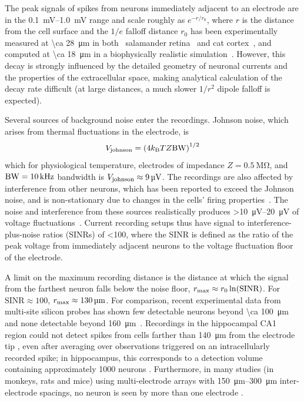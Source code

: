 The peak signals of spikes from neurons immediately adjacent to an electrode are in the \SIrange{0.1}{1.0}{\milli\volt} range and scale roughly as $e^{-r/r_0}$, where $r$ is the distance from the cell surface and the $1/e$ falloff distance $r_0$ has been experimentally measured at \SI{\ca 28}{\micro\meter} in both~\cite{Shoham2006} salamander retina~\cite{segev04} and cat cortex~\cite{gray95}, and computed at \SI{\ca 18}{\micro\meter} in a biophysically realistic simulation~\cite{gold07}.
However, this decay is strongly influenced by the detailed geometry of neuronal currents and the properties of the extracellular space, making analytical calculation of the decay rate difficult (at large distances, a much slower $1/r^2$ dipole falloff is expected).

Several sources of background noise enter the recordings.
Johnson noise, which arises from thermal fluctuations in the electrode, is \[V_{\text{\scriptsize johnson}} = \left(4k_{\text{\scriptsize B}} T Z \text{BW}\right)^{1/2}\]
which for physiological temperature, electrodes of impedance $Z = \SI{0.5}{\mega\ohm}$, and $\text{BW} = \SI{10}{\kilo\hertz}$ bandwidth is $V_{\text{\scriptsize johnson}} \approx \SI{9}{\micro\volt}$.
The recordings are also affected by interference from other neurons, which has been reported to exceed the Johnson noise, and is non-stationary due to changes in the cells' firing properties~\cite{sahani99}. 
The noise and interference from these sources realistically produces \SIrange{>10}{20}{\micro\volt} of voltage fluctuations~\cite{camunas13}.
Current recording setups thus have signal to interference-plus-noise ratios (SINRs) of \num{<100}, where the SINR is defined as the ratio of the peak voltage from immediately adjacent neurons to the voltage fluctuation floor of the electrode.

A limit on the maximum recording distance is the distance at which the signal from the farthest neuron falls below the noise floor, $r_{\text{\scriptsize max}} \approx r_{\text{\scriptsize 0}}\ln(\text{SINR})$. For $\text{SINR} \approx 100$, $r_{\text{\scriptsize max}} \approx \SI{130}{\micro\meter}$. For comparison, recent experimental data from multi-site silicon probes has shown few detectable neurons beyond \SI{\ca 100}{\micro\meter} and none detectable beyond \SI{160}{\micro\meter}~\cite{du11}. 
Recordings in the hippocampal CA1 region could not detect spikes from cells farther than \SI{140}{\micro\meter} from the electrode tip \cite{Henze2000}, even after averaging over observations triggered on an intracellularly recorded spike; in hippocampus, this corresponds to a detection volume containing approximately 1000 neurons \cite{Buzaki2004}. Furthermore, in many studies (in monkeys, rats and mice) using multi-electrode arrays with \SIrange{150}{300}{\micro\meter} inter-electrode spacings, no neuron is seen by more than one electrode \cite{Wessberg2000, Carmena2003, Koralek2012, Jin2010}.

